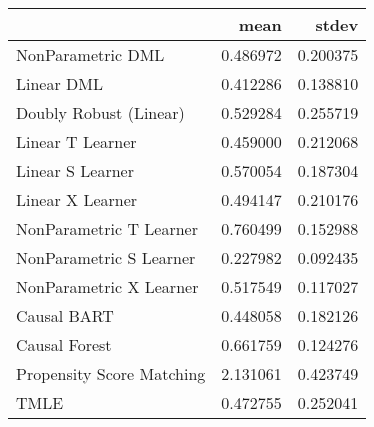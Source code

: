 \begin{tabular}{lrr}
\toprule
{} &      mean &     stdev \\
\midrule
NonParametric DML         &  0.486972 &  0.200375 \\
Linear DML                &  0.412286 &  0.138810 \\
Doubly Robust (Linear)    &  0.529284 &  0.255719 \\
Linear T Learner          &  0.459000 &  0.212068 \\
Linear S Learner          &  0.570054 &  0.187304 \\
Linear X Learner          &  0.494147 &  0.210176 \\
NonParametric T Learner   &  0.760499 &  0.152988 \\
NonParametric S Learner   &  0.227982 &  0.092435 \\
NonParametric X Learner   &  0.517549 &  0.117027 \\
Causal BART               &  0.448058 &  0.182126 \\
Causal Forest             &  0.661759 &  0.124276 \\
Propensity Score Matching &  2.131061 &  0.423749 \\
TMLE                      &  0.472755 &  0.252041 \\
\bottomrule
\end{tabular}
